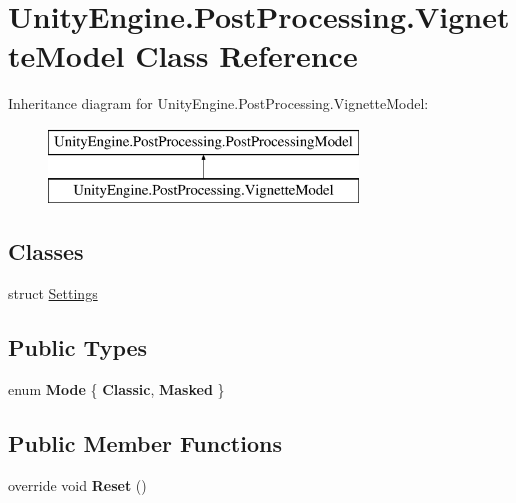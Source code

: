 \hypertarget{class_unity_engine_1_1_post_processing_1_1_vignette_model}{}\section{Unity\+Engine.\+Post\+Processing.\+Vignette\+Model Class Reference}
\label{class_unity_engine_1_1_post_processing_1_1_vignette_model}
Inheritance diagram for Unity\+Engine.\+Post\+Processing.\+Vignette\+Model\+:\begin{figure}[H]
\begin{center}
\leavevmode
\includegraphics[height=2.000000cm]{class_unity_engine_1_1_post_processing_1_1_vignette_model}
\end{center}
\end{figure}
\subsection*{Classes}
\begin{DoxyCompactItemize}
\item 
struct \mbox{\hyperlink{struct_unity_engine_1_1_post_processing_1_1_vignette_model_1_1_settings}{Settings}}
\end{DoxyCompactItemize}
\subsection*{Public Types}
\begin{DoxyCompactItemize}
\item 
\mbox{\label{class_unity_engine_1_1_post_processing_1_1_vignette_model_a98eb04307bcb3c902a1189d324a2f53d}} 
enum {\bfseries Mode} \{ {\bfseries Classic}, 
{\bfseries Masked}
 \}
\end{DoxyCompactItemize}
\subsection*{Public Member Functions}
\begin{DoxyCompactItemize}
\item 
\mbox{\label{class_unity_engine_1_1_post_processing_1_1_vignette_model_a7598645b887ddf177a33787cd06ca751}} 
override void {\bfseries Reset} ()
\end{DoxyCompactItemize}
